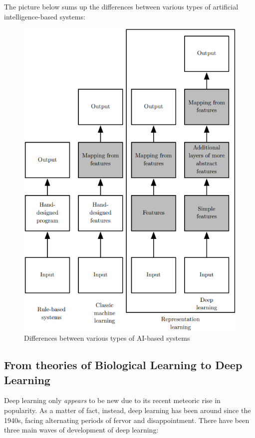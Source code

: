 The picture below sums up the differences between various types of artificial intelligence-based systems:

\begin{figure}[hbt]
    \centering
    \includegraphics[scale=0.6]{Images/Chapter 6/types-ai.png}
    \caption{Differences between various types of AI-based systems}
    \label{fig:ch6-aitypesdifferences}
\end{figure}

\subsection{From theories of Biological Learning to Deep Learning}
Deep learning only \textit{appears} to be new due to its recent meteoric rise in popularity. As a matter of fact, instead, deep learning has been around since the 1940s, facing alternating periods of fervor and disappointment. There have been three main waves of development of deep learning:


